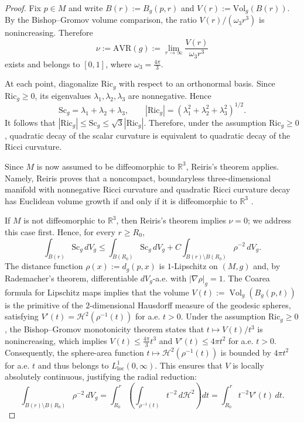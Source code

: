 \documentclass[12pt,oneside,a4paper]{article}
\theoremstyle{mytheorem}
\theoremstyle{remark}
\begin{document}
\begin{proof}


Fix $p\in M$ and write $B(r):=B_g(p,r)$ and $V(r):=\mathrm{Vol}_g(B(r))$. By the Bishop--Gromov volume comparison, the ratio $V(r)/(\omega_3 r^3)$ is nonincreasing. Therefore
$$
\nu:=\mathrm{AVR}(g):=\lim_{r\to\infty}\frac{V(r)}{\omega_3 r^3}
$$
exists and belongs to $[0,1]$, where $\omega_3=\frac{4\pi}{3}$.




At each point, diagonalize $\mathrm{Ric}_g$ with respect to an orthonormal basis. Since $\mathrm{Ric}_g \geq 0$, its eigenvalues $\lambda_1,\lambda_2,\lambda_3$ are nonnegative. Hence
$$
\mathrm{Sc}_g=\lambda_1+\lambda_2+\lambda_3,
\qquad
|\mathrm{Ric}_g|=\left(\lambda_1^2+\lambda_2^2+\lambda_3^2\right)^{1/2}.
$$
It follows that $|\mathrm{Ric}_g|\leq \mathrm{Sc}_g \leq \sqrt{3}|\mathrm{Ric}_g|.$
Therefore, under the assumption $\mathrm{Ric}_g\geq 0$, quadratic decay of the scalar curvature is equivalent to quadratic decay of the Ricci curvature.

Since \(M\) is now assumed to be diffeomorphic to \(\mathbb R^3\), 
Reiris's theorem applies. Namely, Reiris proves that a noncompact, 
boundaryless three-dimensional manifold with nonnegative Ricci curvature 
and quadratic Ricci curvature  decay has Euclidean volume growth if and only if 
it is diffeomorphic to \(\mathbb R^3\) 
\cite[Corollary~1.1]{zbMATH06423474}. 


If $M$ is not diffeomorphic to $\mathbb{R}^3$, then Reiris’s theorem implies $\nu=0$; we address this case first. Hence, for every $r\ge R_0$,
\[
\int_{B(r)}\mathrm{Sc}_g\,dV_g
\le
\int_{B(R_0)}\mathrm{Sc}_g\,dV_g
+
C\int_{B(r)\setminus B(R_0)} \rho^{-2}\,dV_g.
\]
The distance function $\rho(x) := d_g(p, x)$ is $1$-Lipschitz on $(M, g)$ and, by Rademacher’s theorem, differentiable $dV_g$-a.e. with $|\nabla \rho|_g = 1$. The Coarea formula for Lipschitz maps implies that the volume $V(t) := \operatorname{Vol}_g(B_g(p,t))$ is the primitive of the $2$-dimensional Hausdorff measure of the geodesic spheres, satisfying $V'(t) = \mathcal{H}^2(\rho^{-1}(t))$ for a.e. $t > 0$. Under the assumption $\mathrm{Ric}_g \ge 0$, the Bishop–Gromov monotonicity theorem states that $t \mapsto V(t)/t^3$ is nonincreasing, which implies $V(t) \le \frac{4\pi}{3}t^3$ and $V'(t) \le 4\pi t^2$ for a.e. $t > 0$. Consequently, the sphere-area function $t \mapsto \mathcal{H}^2(\rho^{-1}(t))$ is bounded by $4\pi t^2$ for a.e. $t$ and thus belongs to $L^1_{\mathrm{loc}}(0, \infty)$. This ensures that $V$ is locally absolutely continuous, justifying the radial reduction:
$$\int_{B(r) \setminus B(R_0)} \rho^{-2} \, dV_g = \int_{R_0}^r \left( \int_{\rho^{-1}(t)} t^{-2} \, d\mathcal{H}^2 \right) dt = \int_{R_0}^r t^{-2} V'(t) \, dt.$$



\end{proof}
\end{document}
